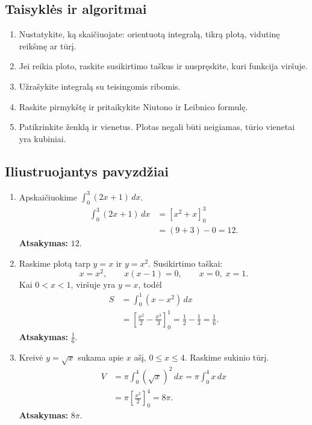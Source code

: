 \subsection{Taisyklės ir algoritmai}
\begin{enumerate}[label=\arabic*.]
\item Nustatykite, ką skaičiuojate: orientuotą integralą, tikrą plotą, vidutinę reikšmę ar tūrį.
\item Jei reikia ploto, raskite susikirtimo taškus ir nuspręskite, kuri funkcija viršuje.
\item Užrašykite integralą su teisingomis ribomis.
\item Raskite pirmykštę ir pritaikykite Niutono ir Leibnico formulę.
\item Patikrinkite ženklą ir vienetus. Plotas negali būti neigiamas, tūrio vienetai yra kubiniai.
\end{enumerate}

\subsection{Iliustruojantys pavyzdžiai}
\begin{enumerate}[label=\arabic*.]
\item Apskaičiuokime \(\int_0^3 (2x+1)\,dx\).
\begin{align}
\int_0^3 (2x+1)\,dx
&=\left[x^2+x\right]_0^3\\
&=(9+3)-0=12.
\end{align}
\textbf{Atsakymas:} \(12\).

\item Raskime plotą tarp \(y=x\) ir \(y=x^2\).
Susikirtimo taškai:
\[
x=x^2,\qquad x(x-1)=0,\qquad x=0,\;x=1.
\]
Kai \(0<x<1\), viršuje yra \(y=x\), todėl
\begin{align}
S&=\int_0^1 (x-x^2)\,dx\\
&=\left[\frac{x^2}{2}-\frac{x^3}{3}\right]_0^1
=\frac12-\frac13=\frac16.
\end{align}
\textbf{Atsakymas:} \(\frac16\).

\item Kreivė \(y=\sqrt{x}\) sukama apie \(x\) ašį, \(0\le x\le4\). Raskime sukinio tūrį.
\begin{align}
V&=\pi\int_0^4 (\sqrt{x})^2\,dx
=\pi\int_0^4 x\,dx\\
&=\pi\left[\frac{x^2}{2}\right]_0^4=8\pi.
\end{align}
\textbf{Atsakymas:} \(8\pi\).
\end{enumerate}

